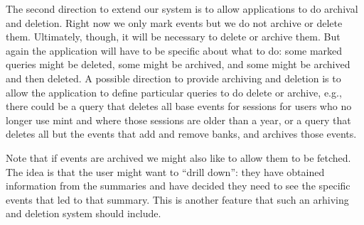 The second direction to extend our system is to allow applications to do archival and deletion. Right now we only mark events but we do not archive or delete them. Ultimately, though, it will be necessary to delete or archive them. But again the application will have to be specific about what to do: some marked queries might be deleted, some might be archived, and some might be archived and then deleted. A possible direction to provide archiving and deletion is to allow the application to define particular queries to do delete or archive, e.g., there could be a query that deletes all base events for sessions for users who no longer use mint and where those sessions are older than a year, or a query that deletes all but the events that add and remove banks, and archives those events.

Note that if events are archived we might also like to allow them to be fetched. The idea is that the user might want to ``drill down'': they have obtained information from the summaries and have decided they need to see the specific events that led to that summary. This is another feature that such an arhiving and deletion system should include.


